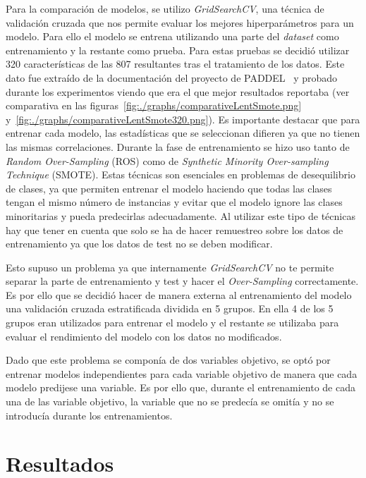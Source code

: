 Para la comparación de modelos, se utilizo \textit{GridSearchCV}, una técnica de validación cruzada que nos permite evaluar los mejores hiperparámetros para un modelo. Para ello el modelo se entrena utilizando una parte del \textit{dataset} como entrenamiento y la restante como prueba. Para estas pruebas se decidió utilizar 320 características de las 807 resultantes tras el tratamiento de los datos. Este dato fue extraído de la documentación del proyecto de PADDEL~\cite{paddelRepo} y probado durante los experimentos viendo que era el que mejor resultados reportaba (ver comparativa en las figuras~\ref{fig:./graphs/comparativeLentSmote.png} y~\ref{fig:./graphs/comparativeLentSmote320.png}). Es importante destacar que para entrenar cada modelo, las estadísticas que se seleccionan difieren ya que no tienen las mismas correlaciones.
Durante la fase de entrenamiento se hizo uso tanto de \textit{Random Over-Sampling} (ROS) como de \textit{Synthetic Minority Over-sampling Technique} (SMOTE). Estas técnicas son esenciales en problemas de desequilibrio de clases, ya que permiten entrenar el modelo haciendo que todas las clases tengan el mismo número de instancias y evitar que el modelo ignore las clases minoritarias y pueda predecirlas adecuadamente. Al utilizar este tipo de técnicas hay que tener en cuenta que solo se ha de hacer remuestreo sobre los datos de entrenamiento ya que los datos de test no se deben modificar. 

Esto supuso un problema ya que internamente \textit{GridSearchCV} no te permite separar la parte de entrenamiento y test y hacer el \textit{Over-Sampling} correctamente. Es por ello que se decidió hacer de manera externa al entrenamiento del modelo una validación cruzada estratificada dividida en 5 grupos. En ella 4 de los 5 grupos eran utilizados para entrenar el modelo y el restante se utilizaba para evaluar el rendimiento del modelo con los datos no modificados.

Dado que este problema se componía de dos variables objetivo, se optó por entrenar modelos independientes para cada variable objetivo de manera que cada modelo predijese una variable. Es por ello que, durante el entrenamiento de cada una de las variable objetivo, la variable que no se predecía se omitía y no se introducía durante los entrenamientos.

\section{Resultados}
\label{Resultados}

